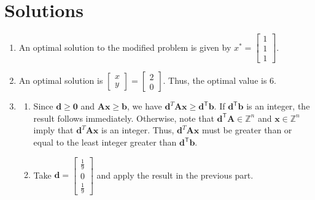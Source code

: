 \documentclass[]{book}
\newcommand{\ZZ}{\mathbb{Z}}
\newcommand{\T}{\mathsf{T}}
\newcommand{\mm}[1]{\mathbf{#1}}
\renewcommand{\vec}[1]{\mathbf{#1}}
\theoremstyle{definition}
\theoremstyle{definition}
\theoremstyle{remark}
\begin{document}
\section*{Solutions}\label{solutions-10}

\begin{enumerate}
\def\labelenumi{\arabic{enumi}.}
\item
  An optimal solution to the modified problem is given by
  \(x^* = \begin{bmatrix} 1\\1\\1 \end{bmatrix}\).
\item
  An optimal solution is
  \(\begin{bmatrix} x\\y \end{bmatrix} = \begin{bmatrix} 2 \\ 0\end{bmatrix}\).
  Thus, the optimal value is \(6\).
\item
  \begin{enumerate}
  \def\labelenumii{\alph{enumii}.}
  \item
    Since \(\vec{d} \geq \vec{0}\) and \(\mm{A}\vec{x} \geq \vec{b}\),
    we have \(\vec{d}^T\mm{A} \vec{x} \geq \vec{d}^\T\vec{b}\). If
    \(\vec{d}^\T\vec{b}\) is an integer, the result follows immediately.
    Otherwise, note that \(\vec{d}^\T\mm{A} \in \ZZ^n\) and
    \(\vec{x}\in \ZZ^n\) imply that \(\vec{d}^T\mm{A} \vec{x}\) is an
    integer. Thus, \(\vec{d}^T\mm{A} \vec{x}\) must be greater than or
    equal to the least integer greater than \(\vec{d}^\T\vec{b}\).
  \item
    Take
    \(\vec{d} = \begin{bmatrix} \frac{1}{9} \\ 0 \\ \frac{1}{9} \end{bmatrix}\)
    and apply the result in the previous part.
  \end{enumerate}
\end{enumerate}


\end{document}
